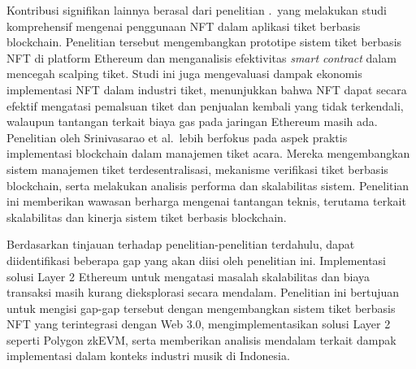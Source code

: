 Kontribusi signifikan lainnya berasal dari penelitian \parencite{Regner2019}.\
yang melakukan studi komprehensif mengenai penggunaan NFT dalam aplikasi tiket
berbasis blockchain. Penelitian tersebut mengembangkan prototipe sistem tiket
berbasis NFT di platform Ethereum dan menganalisis efektivitas \emph{smart
  contract} dalam mencegah scalping tiket. Studi ini juga mengevaluasi dampak
ekonomis implementasi NFT dalam industri tiket, menunjukkan bahwa NFT dapat
secara efektif mengatasi pemalsuan tiket dan penjualan kembali yang tidak
terkendali, walaupun tantangan terkait biaya gas pada jaringan Ethereum masih
ada. Penelitian oleh Srinivasarao et al.\ lebih berfokus pada aspek praktis
implementasi blockchain dalam manajemen tiket acara. Mereka mengembangkan
sistem manajemen tiket terdesentralisasi, mekanisme verifikasi tiket berbasis
blockchain, serta melakukan analisis performa dan skalabilitas sistem.
Penelitian ini memberikan wawasan berharga mengenai tantangan teknis, terutama
terkait skalabilitas dan kinerja sistem tiket berbasis blockchain.

Berdasarkan tinjauan terhadap penelitian-penelitian terdahulu, dapat
diidentifikasi beberapa gap yang akan diisi oleh penelitian ini. Implementasi
solusi Layer 2 Ethereum untuk mengatasi masalah skalabilitas dan biaya
transaksi masih kurang dieksplorasi secara mendalam. Penelitian ini bertujuan
untuk mengisi gap-gap tersebut dengan mengembangkan sistem tiket berbasis NFT
yang terintegrasi dengan Web 3.0, mengimplementasikan solusi Layer 2 seperti
Polygon zkEVM, serta memberikan analisis mendalam terkait dampak implementasi
dalam konteks industri musik di Indonesia.






